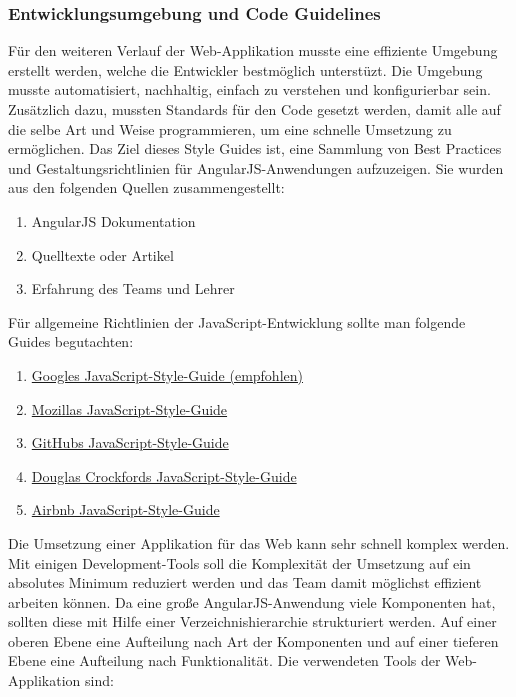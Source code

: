 \subsubsection{Entwicklungsumgebung und Code Guidelines}
Für den weiteren Verlauf der Web-Applikation musste eine effiziente Umgebung erstellt werden, welche die Entwickler bestmöglich unterstüzt. Die Umgebung musste automatisiert, nachhaltig, einfach zu verstehen und konfigurierbar sein. Zusätzlich dazu, mussten Standards für den Code gesetzt werden, damit alle auf die selbe Art und Weise programmieren, um eine schnelle Umsetzung zu ermöglichen. Das Ziel dieses Style Guides ist, eine Sammlung von Best Practices und Gestaltungsrichtlinien für AngularJS-Anwendungen aufzuzeigen. Sie wurden aus den folgenden Quellen zusammengestellt:

\begin{enumerate}
\def\labelenumi{\arabic{enumi}.}
\item AngularJS Dokumentation
\item Quelltexte oder Artikel
\item Erfahrung des Teams und Lehrer
\end{enumerate}

Für allgemeine Richtlinien der JavaScript-Entwicklung sollte man folgende Guides begutachten:

\begin{enumerate}
\def\labelenumi{\arabic{enumi}.}
\item \href{http://google-styleguide.googlecode.com/svn/trunk/javascriptguide.xml}{Googles JavaScript-Style-Guide (empfohlen)}
\item \href{https://developer.mozilla.org/en-US/docs/Developer_Guide/Coding_Style}{Mozillas JavaScript-Style-Guide}
\item \href{https://github.com/styleguide/javascript}{GitHubs JavaScript-Style-Guide}
\item \href{http://javascript.crockford.com/code.html}{Douglas Crockfords JavaScript-Style-Guide}
\item \href{https://github.com/airbnb/javascript}{Airbnb JavaScript-Style-Guide}
\end{enumerate}

Die Umsetzung einer Applikation für das Web kann sehr schnell komplex werden. Mit einigen Development-Tools soll die Komplexität der Umsetzung auf ein absolutes Minimum reduziert werden und das Team damit möglichst effizient arbeiten können. Da eine große AngularJS-Anwendung viele Komponenten hat, sollten diese mit Hilfe einer Verzeichnishierarchie strukturiert werden. Auf einer oberen Ebene eine Aufteilung nach Art der Komponenten und auf einer tieferen Ebene eine Aufteilung nach Funktionalität. Die verwendeten Tools der Web-Applikation sind:

